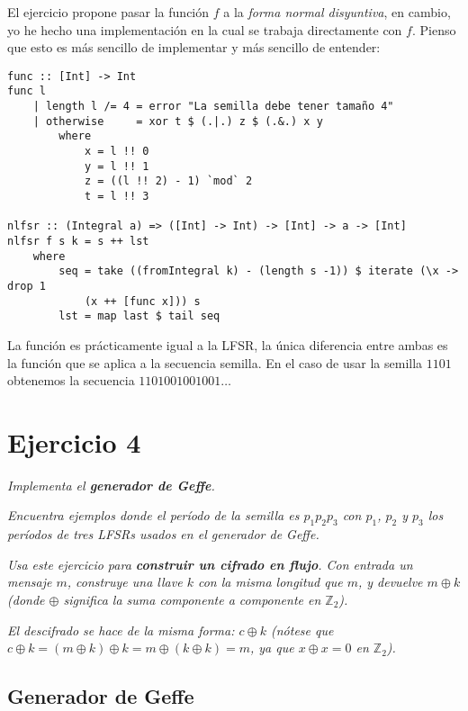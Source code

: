 \documentclass[10pt,spanish]{article}
\begin{document}
El ejercicio propone pasar la función $f$ a la \textit{\textcolor{azul}{forma normal disyuntiva}}, en cambio, yo he hecho una implementación en la cual se trabaja directamente con $f$. Pienso que esto es más sencillo de implementar y más sencillo de entender:

\begin{verbatim}
func :: [Int] -> Int
func l
    | length l /= 4 = error "La semilla debe tener tamaño 4"
    | otherwise     = xor t $ (.|.) z $ (.&.) x y
        where
            x = l !! 0
            y = l !! 1
            z = ((l !! 2) - 1) `mod` 2
            t = l !! 3

nlfsr :: (Integral a) => ([Int] -> Int) -> [Int] -> a -> [Int]
nlfsr f s k = s ++ lst
    where
        seq = take ((fromIntegral k) - (length s -1)) $ iterate (\x -> drop 1 
            (x ++ [func x])) s
        lst = map last $ tail seq

\end{verbatim}

La función es prácticamente igual a la LFSR, la única diferencia entre ambas es la función que se aplica a la secuencia semilla. En el caso de usar la semilla $1101$ obtenemos la secuencia $1101001001001\ldots$

\section{\textcolor{azul}Ejercicio 4}
\textit{Implementa el \textbf{\textcolor{azul}{generador de Geffe}}.}

\textit{Encuentra ejemplos donde el período de la semilla es $p_1 p_2 p_3$ con $p_1$, $p_2$ y $p_3$ los períodos de tres LFSRs usados en el generador de Geffe.}

\textit{Usa este ejercicio para \textbf{\textcolor{azul}{construir un cifrado en flujo}}. Con entrada un mensaje $m$, construye una llave $k$ con la misma longitud que $m$, y devuelve $m \oplus k$ (donde $\oplus$ significa la suma componente a componente en $\mathbb{Z}_2$).}

\textit{El descifrado se hace de la misma forma: $c \oplus k$ (nótese que $c \oplus k = (m \oplus k) \oplus k = m \oplus (k \oplus k) = m$, ya que $x \oplus x = 0$ en $\mathbb{Z}_2$).}

\subsection{\textcolor{azul}Generador de Geffe}
\end{document}
